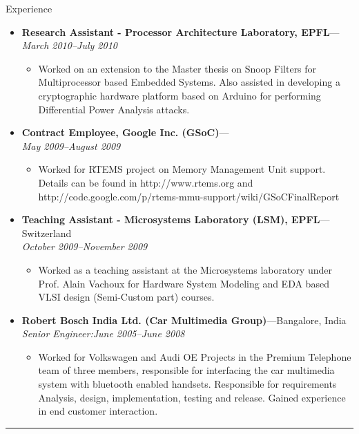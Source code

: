 \documentclass[11pt,oneside]{article}
\newenvironment{ressection}[1]{
	\vspace{4pt}
	{\fontfamily{phv}\selectfont\Large#1}
	\begin{itemize}
	\vspace{3pt}
}{
	\end{itemize}
}
\newcommand{\resitem}[1]{
	\vspace{-4pt}
	\item \begin{flushleft} #1 \end{flushleft}
}
\newcommand{\ressubitem}[1]{
	\vspace{-1pt}
	\item \begin{flushleft} #1 \end{flushleft}
}
\newcommand{\resbigitem}[3]{
	\vspace{-5pt}
	\item
	\textbf{#1}---#2 \\
	\textit{#3}
}
\newenvironment{ressubsec}[3]{
	\resbigitem{#1}{#2}{#3}
	\vspace{-2pt}
	\begin{itemize}
}{
	\end{itemize}
}
\newenvironment{reslist}[1]{
	\resitem{\textbf{#1}}
	\vspace{-5pt}
	\begin{itemize}
}{
	\end{itemize}
}
\begin{document}
\begin{ressection}{Experience}

  
      \begin{ressubsec}{Research Assistant - Processor Architecture
          Laboratory, EPFL}{}{March 2010--July 2010}
        \ressubitem{Worked on an extension to the Master thesis on Snoop
          Filters for Multiprocessor based Embedded Systems. Also assisted in
          developing a cryptographic hardware platform based on Arduino for
          performing Differential Power Analysis attacks.}
       \end{ressubsec}	

    \begin{ressubsec}{Contract Employee, Google Inc. (GSoC)}{}{May 2009--August 2009}
      \ressubitem{Worked for RTEMS project on Memory Management Unit support.
        Details can be found in http://www.rtems.org and
        http://code.google.com/p/rtems-mmu-support/wiki/GSoCFinalReport }
       \end{ressubsec}	

    \begin{ressubsec}{Teaching Assistant - Microsystems Laboratory (LSM),
        EPFL}{Switzerland}{October 2009--November 2009}
	    \ressubitem{Worked as a teaching assistant at the Microsystems
        laboratory under Prof. Alain Vachoux for Hardware System Modeling and
        EDA based VLSI design (Semi-Custom part) courses.}\end{ressubsec}

	
	\begin{ressubsec}{Robert Bosch India Ltd. (Car Multimedia Group)}{Bangalore, India}{Senior Engineer:June 2005--June 2008}
		\ressubitem{Worked for Volkswagen and Audi OE Projects in the Premium
      Telephone team of three members, responsible for interfacing the car
      multimedia system with bluetooth enabled handsets. Responsible for
      requirements Analysis, design, implementation, testing and release.
      Gained experience in end customer interaction.}	\end{ressubsec}

\end{ressection}
\rule{\textwidth}{.5pt}
\end{document}
